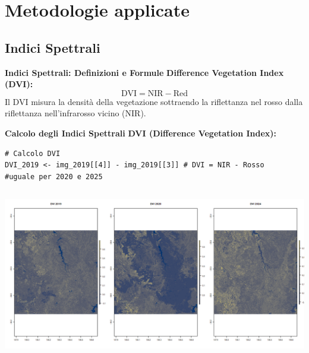 \documentclass{beamer}
\begin{document}
\section{Metodologie applicate}

\subsection{Indici Spettrali}

\begin{frame}{\textbf{Indici Spettrali: Definizioni e Formule}}
\textbf{Difference Vegetation Index (DVI):}
\newline
\begin{equation}
\text{DVI} = \text{NIR} - \text{Red}
\end{equation}
\newline
Il DVI misura la densità della vegetazione sottraendo la riflettanza nel rosso dalla riflettanza nell'infrarosso vicino (NIR).
\end{frame}

\begin{frame}[fragile]{\textbf{Calcolo degli Indici Spettrali}}
\textbf{DVI (Difference Vegetation Index):}
\begin{lstlisting}
# Calcolo DVI
DVI_2019 <- img_2019[[4]] - img_2019[[3]] # DVI = NIR - Rosso
#uguale per 2020 e 2025
\end{lstlisting}
\begin{columns}
    \centering
    \includegraphics[width=\textwidth]{DVI.png}
\end{columns}
\end{frame}
\end{document}
